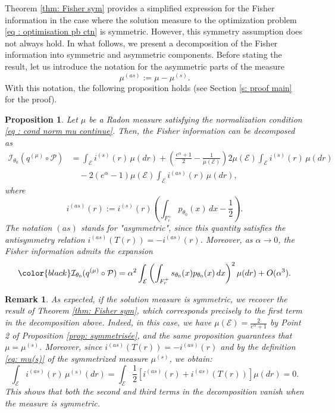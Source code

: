 \documentclass[a4paper, 11pt]{article}
\newtheorem{prop}{Proposition}
\newtheorem{rem}{Remark}
\theoremstyle{definition}
\newcommand{\modar}{\color{black}}
\begin{document}
{Theorem \ref{thm: Fisher sym} provides a simplified expression for the Fisher information in the case where the solution measure to the optimization problem \eqref{eq : optimisation pb ctn} is symmetric. However, this symmetry assumption does not always hold. In what follows, we present a decomposition of the Fisher information into symmetric and asymmetric components. Before stating the result, let us introduce the notation for the asymmetric parts of the measure 
\[
\mu^{(as)} := \mu - \mu^{(s)}.
\]
With this notation, the following proposition holds (see Section \ref{s: proof main} for the proof).

\begin{prop}\label{p: decomp fisher sym}
Let \( \mu \) be a Radon measure satisfying the normalization condition \eqref{eq : cond norm mu continue}. Then, the Fisher information can be decomposed as
\begin{align*}
\mathcal{I}_{\theta_0}(q^{(\mu)} \circ \mathcal{P}) 
&= \int_{\mathcal{E}} i^{(s)}(r) \, \mu(dr) 
+ \left( \frac{e^\alpha + 1}{2} - \frac{1}{\mu(\mathcal{E})} \right) 2 \mu(\mathcal{E}) \int_{\mathcal{E}} i^{(s)}(r) \, \mu(dr) \\
&\quad -2 (e^\alpha - 1)\mu(\mathcal{E})\int_{\mathcal{E}} i^{(as)}(r) \, \mu(dr),
\end{align*}
where
\[
i^{(as)}(r) := i^{(s)}(r) \left( \int_{F_r^+} p_{\theta_0}(x) \, dx - \frac{1}{2} \right).
\]
The notation \((as)\) stands for "asymmetric", since this quantity satisfies the antisymmetry relation \( i^{(as)}(T(r)) = -i^{(as)}(r) \). Moreover, as \( \alpha \to 0 \), the Fisher information admits the expansion
\[
{\modar \mathcal{I}_{\theta_0}(q^{(\mu)} \circ \mathcal{P}) 
= 
\alpha^2\int_{\mathcal{E}} \left( \int_{F_r^+} s_{\theta_0}(x) p_{\theta_0}(x) \, dx \right)^2 \mu(dr) + O(\alpha^3).}
\]
\end{prop}

\begin{rem}{\label{rk: retrieve sym Fisher}}
As expected, if the solution measure is symmetric, we recover the result of Theorem \ref{thm: Fisher sym}, which corresponds precisely to the first term in the decomposition above. Indeed, in this case, we have \( \mu(\mathcal{E}) = \frac{2}{e^\alpha + 1} \) by Point 2 of Proposition \ref{prop: symmetrisée}, and the same proposition guarantees that \( \mu = \mu^{(s)} \). Moreover, since \( i^{(as)}(T(r)) = -i^{(as)}(r) \) and by the definition \eqref{eq: mu(s)} of the symmetrized measure \( \mu^{(s)} \), we obtain:
\[
\int_{\mathcal{E}} i^{(as)}(r) \, \mu^{(s)}(dr) = \int_{\mathcal{E}} \frac{1}{2} \left[ i^{(as)}(r) + i^{(as)}(T(r)) \right] \mu(dr) = 0.
\]
This shows that both the second and third terms in the decomposition vanish when the measure is symmetric.
\end{rem}

}
\end{document}
